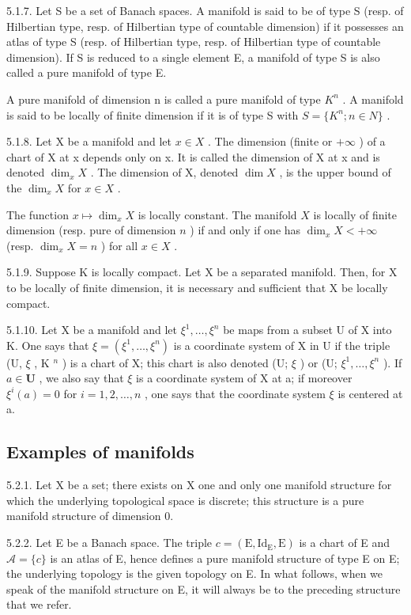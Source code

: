 5.1.7. Let S be a set of Banach spaces. A manifold is said to be of type S (resp. of Hilbertian type, resp. of Hilbertian type of countable dimension) if it possesses an atlas of type S (resp. of Hilbertian type, resp. of Hilbertian type of countable dimension). If S is reduced to a single element E, a manifold of type S is also called a pure manifold of type E.

A pure manifold of dimension n is called a pure manifold of type \(K^{n}\) . A manifold is said to be locally of finite dimension if it is of type S with \(S = \{K^{n}; n \in N\}\) .

5.1.8. Let X be a manifold and let \(x \in X\) . The dimension (finite or \(+\infty\) ) of a chart of X at x depends only on x. It is called the dimension of X at x and is denoted \(\dim_{x}X\) . The dimension of X, denoted \(\dim X\) , is the upper bound of the \(\dim_{x}X\) for \(x \in X\) .

The function \(x \mapsto \dim_x X\) is locally constant. The manifold \(X\) is locally of finite dimension (resp. pure of dimension \(n\) ) if and only if one has \(\dim_x X < +\infty\) (resp. \(\dim_x X = n\) ) for all \(x \in X\) .

5.1.9. Suppose K is locally compact. Let X be a separated manifold. Then, for X to be locally of finite dimension, it is necessary and sufficient that X be locally compact.

5.1.10. Let X be a manifold and let \(\xi^{1},\ldots,\xi^{n}\) be maps from a subset U of X into K. One says that \(\xi=(\xi^{1},\ldots,\xi^{n})\) is a coordinate system of X in U if the triple (U, \(\xi\) , K \(^{n}\) ) is a chart of X; this chart is also denoted (U; \(\xi\) ) or (U; \(\xi^{1},\ldots,\xi^{n}\) ). If \(a\in\mathbf{U}\) , we also say that \(\xi\) is a coordinate system of X at a; if moreover \(\xi^{i}(a)=0\) for \(i=1,2,\ldots,n\) , one says that the coordinate system \(\xi\) is centered at a.

\subsection{Examples of manifolds}

5.2.1. Let X be a set; there exists on X one and only one manifold structure for which the underlying topological space is discrete; this structure is a pure manifold structure of dimension 0.

5.2.2. Let E be a Banach space. The triple \(c = (\mathrm{E}, \mathrm{Id}_{\mathrm{E}}, \mathrm{E})\) is a chart of E and \(\mathcal{A} = \{c\}\) is an atlas of E, hence defines a pure manifold structure of type E on E; the underlying topology is the given topology on E. In what follows, when we speak of the manifold structure on E, it will always be to the preceding structure that we refer.

